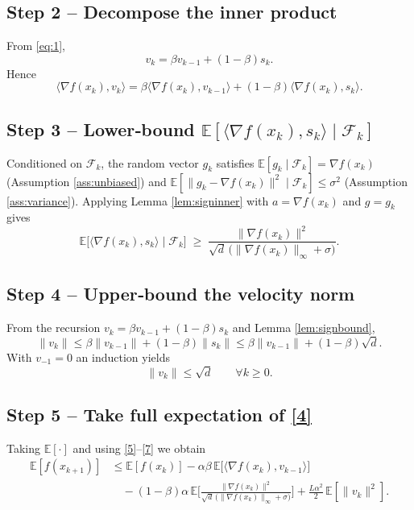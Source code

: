 \documentclass{article}
\newcommand{\E}{\mathbb{E}}
\begin{document}
\subsection*{Step 2 – Decompose the inner product}
From \eqref{eq:1},
\[
v_k=\beta v_{k-1}+(1-\beta)s_k .
\]
Hence
\[
\langle\nabla f(x_k),v_k\rangle
= \beta\langle\nabla f(x_k),v_{k-1}\rangle
  +(1-\beta)\langle\nabla f(x_k),s_k\rangle .
\tag{5}
\]

\subsection*{Step 3 – Lower‑bound $\E[\langle\nabla f(x_k),s_k\rangle\mid\mathcal{F}_k]$}
Conditioned on $\mathcal{F}_k$, the random vector $g_k$ satisfies
$\E[g_k\mid\mathcal{F}_k]=\nabla f(x_k)$ (Assumption \ref{ass:unbiased}) and
$\E[\|g_k-\nabla f(x_k)\|^{2}\mid\mathcal{F}_k]\le\sigma^{2}$ (Assumption \ref{ass:variance}).
Applying Lemma \ref{lem:signinner} with $a=\nabla f(x_k)$ and $g=g_k$ gives
\[
\E\!\big[\langle\nabla f(x_k),s_k\rangle\mid\mathcal{F}_k\big]
\;\ge\;
\frac{\|\nabla f(x_k)\|^{2}}
     {\sqrt{d}\,\big(\|\nabla f(x_k)\|_{\infty}+ \sigma\big)} .
\tag{6}
\]

\subsection*{Step 4 – Upper‑bound the velocity norm}
From the recursion $v_k=\beta v_{k-1}+(1-\beta)s_k$ and Lemma \ref{lem:signbound},
\[
\|v_k\|
   \le \beta\|v_{k-1}\|+(1-\beta)\|s_k\|
   \le \beta\|v_{k-1}\|+(1-\beta)\sqrt{d}.
\]
With $v_{-1}=0$ an induction yields
\[
\|v_k\|\le\sqrt{d}\qquad\forall k\ge0 .
\tag{7}
\]

\subsection*{Step 5 – Take full expectation of \eqref{4}}
Taking $\E[\cdot]$ and using \eqref{5}–\eqref{7} we obtain
\[
\begin{aligned}
\E[f(x_{k+1})]
&\le \E[f(x_k)]
   -\alpha\beta\,\E\!\big[\langle\nabla f(x_k),v_{k-1}\rangle\big]  \\
&\quad -(1-\beta)\alpha\,
   \E\!\Big[\frac{\|\nabla f(x_k)\|^{2}}
                {\sqrt{d}\,\big(\|\nabla f(x_k)\|_{\infty}+ \sigma\big)}\Big]
   +\frac{L\alpha^{2}}{2}\,\E[\|v_k\|^{2}] .
\end{aligned}
\tag{8}
\]
\end{document}
